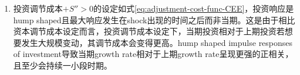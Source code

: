 \begin{subappendices}
\begin{enumerate}
\begin{enumerate}
\item 投资调节成本$+ S'' >0$的设定如式\eqref{eq:adjustment-cost-func-CEE}，投资响应是hump shaped且最大响应发生在shock出现的时间之后而非当期。这是由于相比资本调节成本设定而言，投资调节成本设定下，当期投资相对于上期投资若想要发生大规模变动，其调节成本会变得更高。hump shaped impulse responses of investment导致当期growth rate相对于上期growth rate呈现更强的正相关，且至少会持续一小段时期。
\end{enumerate}
\end{enumerate}
\end{subappendices}

